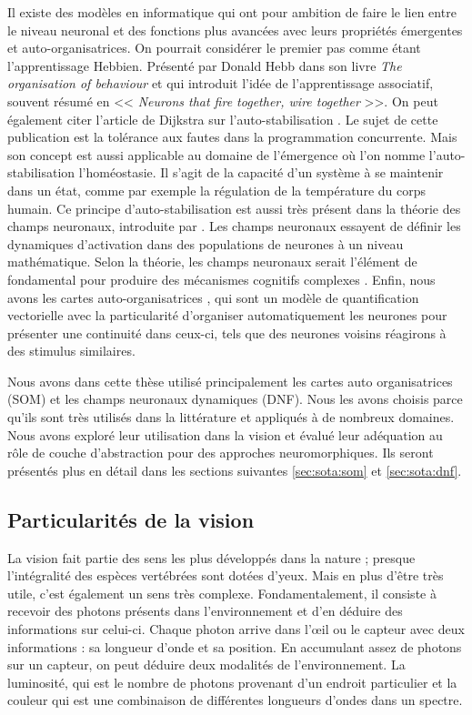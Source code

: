 	Il existe des modèles en informatique qui ont pour ambition de faire le lien entre le niveau neuronal et des fonctions plus avancées avec leurs propriétés émergentes et auto-organisatrices. On pourrait considérer le premier pas comme étant l'apprentissage Hebbien. Présenté par Donald Hebb dans son livre \textit{The organisation of behaviour} \cite{hebb1949organisation} et qui introduit l'idée de l'apprentissage associatif, souvent résumé en << \textit{Neurons that fire together, wire together} >>. On peut également citer l'article de Dijkstra sur l'auto-stabilisation \cite{dijkstra1982self}. Le sujet de cette publication est la tolérance aux fautes dans la programmation concurrente. Mais son concept est aussi applicable au domaine de l'émergence où l'on nomme l'auto-stabilisation l'homéostasie. Il s'agit de la capacité d'un système à se maintenir dans un état, comme par exemple la régulation de la température du corps humain. Ce principe d'auto-stabilisation est aussi très présent dans la théorie des champs neuronaux, introduite par \cite{amari1977dynamics}. Les champs neuronaux essayent de définir les dynamiques d'activation dans des populations de neurones à un niveau mathématique. Selon la théorie, les champs neuronaux serait l'élément de fondamental pour produire des mécanismes cognitifs complexes \cite{sandamirskaya2014dynamic}. Enfin, nous avons les cartes auto-organisatrices \cite{kohonen-som82}, qui sont un modèle de quantification vectorielle avec la particularité d'organiser automatiquement les neurones pour présenter une continuité dans ceux-ci, tels que des neurones voisins réagirons à des stimulus similaires.

	Nous avons dans cette thèse utilisé principalement les cartes auto organisatrices (SOM) et les champs neuronaux dynamiques (DNF). Nous les avons choisis parce qu'ils sont très utilisés dans la littérature et appliqués à de nombreux domaines. Nous avons exploré leur utilisation dans la vision et évalué leur adéquation au rôle de couche d'abstraction pour des approches neuromorphiques. Ils seront présentés plus en détail dans les sections suivantes \ref{sec:sota:som} et \ref{sec:sota:dnf}.

\subsection{Particularités de la vision}\label{sec:sota:vision}

	La vision fait partie des sens les plus développés dans la nature ; presque l'intégralité des espèces vertébrées sont dotées d'yeux. Mais en plus d'être très utile, c'est également un sens très complexe. Fondamentalement, il consiste à recevoir des photons présents dans l'environnement et d'en déduire des informations sur celui-ci. Chaque photon arrive dans l'œil ou le capteur avec deux informations : sa longueur d'onde et sa position. En accumulant assez de photons sur un capteur, on peut déduire deux modalités de l'environnement. La luminosité, qui est le nombre de photons provenant d'un endroit particulier et la couleur qui est une combinaison de différentes longueurs d'ondes dans un spectre.

